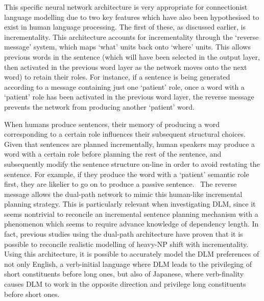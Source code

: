 \documentclass{article}
\begin{document}
This specific neural network architecture is very appropriate for connectionist language modelling due to two key features which have also been hypothesised to exist in human language processing. The first of these, as discussed earlier, is incrementality. This architecture accounts for incrementality through the `reverse message' system, which maps `what' units back onto `where' units. This allows previous words in the sentence (which will have been selected in the output layer, then activated in the previous word layer as the network moves onto the next word) to retain their roles. For instance, if a sentence is being generated according to a message containing just one `patient' role, once a word with a `patient' role has been activated in the previous word layer, the reverse message prevents the network from producing another `patient' word. 

When humans produce sentences, their memory of producing a word corresponding to a certain role influences their subsequent structural choices. Given that sentences are planned incrementally, human speakers may produce a word with a certain role before planning the rest of the sentence, and subsequently modify the sentence structure on-line in order to avoid restating the sentence. For example, if they produce the word with a `patient' semantic role first, they are likelier to go on to produce a passive sentence.~\cite{chang2009} The reverse message allows the dual-path network to mimic this human-like incremental planning strategy. This is particularly relevant when investigating DLM, since it seems nontrivial to reconcile an incremental sentence planning mechanism with a phenomenon which seems to require advance knowledge of dependency length. In fact, previous studies using the dual-path architecture have proven that it is possible to reconcile realistic modelling of heavy-NP shift with incrementality. Using this architecture, it is possible to accurately model the DLM preferences of not only English, a verb-initial language where DLM leads to the privileging of short constituents before long ones, but also of Japanese, where verb-finality causes DLM to work in the opposite direction and privilege long constituents before short ones.~\cite{chang2009}
\end{document}
